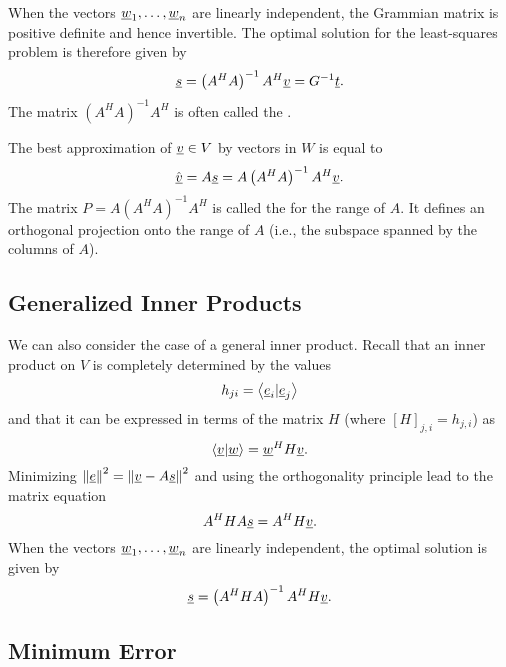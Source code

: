 When the vectors $\underline{w}_1, \ldots, \underline{w}_n$ are linearly independent, the Grammian matrix is positive definite and hence invertible.
The optimal solution for the least-squares problem is therefore given by
\begin{equation*}
\underline{s} = \left( A^H A \right)^{-1} A^H \underline{v} = G^{-1} \underline{t} .
\end{equation*}
The matrix $\left( A^H A \right)^{-1} A^H$ is often called the .

The best approximation of $\underline{v} \in V$ by vectors in $W$ is equal to
\begin{equation*}
\hat{\underline{v}} = A \underline{s} = A \left( A^H A \right)^{-1} A^H \underline{v} .
\end{equation*}
The matrix $P = A \left( A^H A \right)^{-1} A^H$ is called the  for the range of $A$.
It defines an orthogonal projection onto the range of $A$ (i.e., the subspace spanned by the columns of $A$).


\subsection{Generalized Inner Products}

We can also consider the case of a general inner product.
Recall that an inner product on $V$ is completely determined by the values
\begin{equation*}
h_{ji} = \left\langle \underline{e}_i | \underline{e}_j \right\rangle
\end{equation*}
and that it can be expressed in terms of the matrix $H$ (where $[H]_{j,i} = h_{j,i}$) as
\begin{equation*}
\left\langle \underline{v} | \underline{w} \right\rangle
= \underline{w}^H H \underline{v}.
\end{equation*}
Minimizing $\left\| \underline{e} \right\|^2 = \left\| \underline{v} - A \underline{s} \right\|^2$ and using the orthogonality principle lead to the matrix equation
\begin{equation*}
A^H H A \underline{s} = A^H H \underline{v}.
\end{equation*}
When the vectors $\underline{w}_1, \ldots, \underline{w}_n$ are linearly independent, the optimal solution is given by
\begin{equation*}
\underline{s} = \left( A^H H A \right)^{-1} A^H H \underline{v}.
\end{equation*}


\subsection{Minimum Error}

